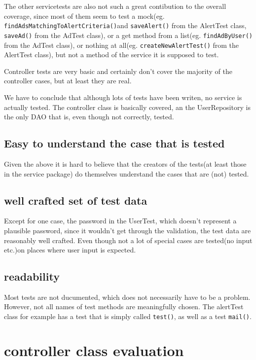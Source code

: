 \documentclass[a4wide]{article}
\begin{document}
The other servicetests are also not such a great contibution to the overall coverage, since most of them seem to test a mock(eg. \texttt{findAdsMatchingToAlertCriteria()}and \texttt{saveAlert()} from the AlertTest class, \texttt{saveAd()} from the AdTest class), or a get method from a list(eg. \texttt{findAdByUser()} from the AdTest class), or nothing at all(eg. \texttt{createNewAlertTest()} from the AlertTest class), but not a method of the service it is supposed to test. 

Controller tests are very basic and certainly don't cover the majority of the controller cases, but at least they are real. 

We have to conclude that although lots of tests have been writen, no service is actually tested. The controller class is basically covered, an the UserRepository is the only DAO that is, even though not correctly, tested. 
\subsection{Easy to understand the case that is tested}
Given the above it is hard to believe that the creators of the tests(at least those in the service package) do themselves understand the cases that are (not) tested. 
\subsection{well crafted set of test data}
Except for one case, the password in the UserTest, which doesn't represent a plausible password, since it wouldn't get through the validation, the test data are reasonably well crafted. Even though not a lot of special cases are tested(no input etc.)on places where user input is expected. 
\subsection{readability}
Most tests are not ducumented, which does not necessarily have to be a problem. However, not all names of test methods are meaningfully chosen. The alertTest class for example has a test that is simply called \texttt{test()}, as well as a test \texttt{mail()}. 
\section{controller class evaluation}
\end{document}
